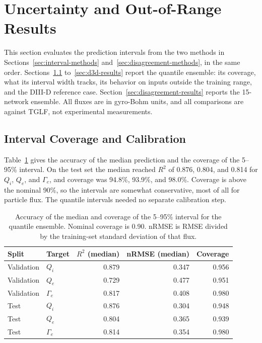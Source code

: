 \documentclass[12pt,letterpaper]{article}
\begin{document}
\section{Uncertainty and Out-of-Range Results}
\label{sec:uncertainty-results}

This section evaluates the prediction intervals from the two methods in
Sections~\ref{sec:interval-methods} and~\ref{sec:disagreement-methods}, in the
same order. Sections~\ref{sec:coverage-results} to~\ref{sec:d3d-results}
report the quantile ensemble: its coverage, what its interval
width tracks, its behavior on inputs outside the training range, and the
DIII-D reference case. Section~\ref{sec:disagreement-results} reports the
15-network ensemble. All fluxes are in gyro-Bohm units, and all
comparisons are against TGLF, not experimental measurements.

\subsection{Interval Coverage and Calibration}
\label{sec:coverage-results}

Table~\ref{tab:coverage} gives the accuracy of the median prediction and the
coverage of the 5--95\% interval. On the test set the median reached $R^2$ of
0.876, 0.804, and 0.814 for $Q_i$, $Q_e$, and $\Gamma_e$, and coverage was
94.8\%, 93.9\%, and 98.0\%. Coverage is above the nominal 90\%, so the
intervals are somewhat conservative, most of all for particle flux. The
quantile intervals needed no separate calibration step.

\begin{table}[htbp]
  \centering
  \small
  \begin{tabular}{llrrr}
    \toprule
    Split      & Target     & $R^2$ (median) & nRMSE (median) & Coverage \\
    \midrule
    Validation & $Q_i$      & 0.879          & 0.347          & 0.956    \\
    Validation & $Q_e$      & 0.729          & 0.477          & 0.951    \\
    Validation & $\Gamma_e$ & 0.817          & 0.408          & 0.980    \\
    Test       & $Q_i$      & 0.876          & 0.304          & 0.948    \\
    Test       & $Q_e$      & 0.804          & 0.365          & 0.939    \\
    Test       & $\Gamma_e$ & 0.814          & 0.354          & 0.980    \\
    \bottomrule
  \end{tabular}
  \caption{Accuracy of the median and coverage of the 5--95\% interval for the
    quantile ensemble. Nominal coverage is 0.90. nRMSE is RMSE
    divided by the training-set standard deviation of that flux.}
  \label{tab:coverage}
\end{table}
\end{document}
